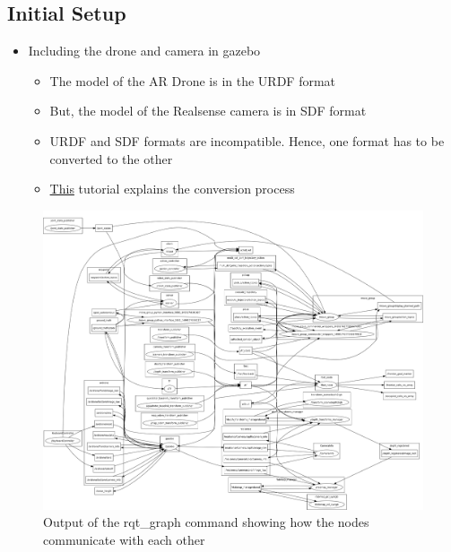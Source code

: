 \documentclass[a4paper,12pt,oneside]{book}
\begin{document}
\subsection*{Initial Setup}
\begin{itemize}
	\item Including the drone and camera in gazebo
		\begin{itemize}
			\item The model of the AR Drone is in the URDF format
			\item But, the model of the Realsense camera is in SDF format
			\item URDF and SDF formats are incompatible. Hence, one format has to be converted to the other
			\item \href{https://github.com/eYSIP-2017/eYSIP-2017_Indoor-Environments-Mapping-using-UAV/blob/master/Documents/Tutorials/Adding%20Realsense%20R200%20camera%20to%20ARDrone%20in%20Gazebo7.pdf}{This} tutorial explains the conversion process
		\end{itemize}
\end{itemize}

\vspace{.5in}

\begin{figure}[h]
	\centering
	\includegraphics[scale=0.14]{rosgraph}
	\caption{Output of the rqt\_graph command showing how the nodes communicate with each other}
\end{figure}
	
\end{document}
